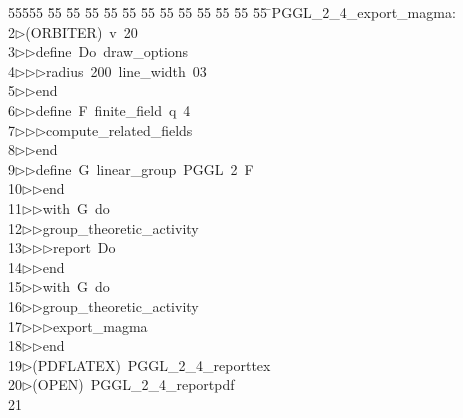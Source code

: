 %
%
\begin{tabbing}
55555 \= 55 \= 55 \= 55 \= 55 \= 55 \= 55 \= 55 \= 55 \= 55 \= 55 \= 55 \= 55 \= \>PGGL\_2\_4\_export\_magma:\\[0pt]
2\>$\triangleright$\>(ORBITER)\ v\ 20\ \\[0pt]
3\>$\triangleright$\>$\triangleright$\>define\ Do\ draw\_options\ \\[0pt]
4\>$\triangleright$\>$\triangleright$\>$\triangleright$\>radius\ 200\ line\_width\ 03\ \\[0pt]
5\>$\triangleright$\>$\triangleright$\>end\ \\[0pt]
6\>$\triangleright$\>$\triangleright$\>define\ F\ finite\_field\ q\ 4\ \\[0pt]
7\>$\triangleright$\>$\triangleright$\>$\triangleright$\>compute\_related\_fields\ \\[0pt]
8\>$\triangleright$\>$\triangleright$\>end\ \\[0pt]
9\>$\triangleright$\>$\triangleright$\>define\ G\ linear\_group\ PGGL\ 2\ F\ \\[0pt]
10\>$\triangleright$\>$\triangleright$\>end\ \\[0pt]
11\>$\triangleright$\>$\triangleright$\>with\ G\ do\ \\[0pt]
12\>$\triangleright$\>$\triangleright$\>group\_theoretic\_activity\ \\[0pt]
13\>$\triangleright$\>$\triangleright$\>$\triangleright$\>report\ Do\ \\[0pt]
14\>$\triangleright$\>$\triangleright$\>end\ \\[0pt]
15\>$\triangleright$\>$\triangleright$\>with\ G\ do\ \\[0pt]
16\>$\triangleright$\>$\triangleright$\>group\_theoretic\_activity\ \\[0pt]
17\>$\triangleright$\>$\triangleright$\>$\triangleright$\>export\_magma\ \\[0pt]
18\>$\triangleright$\>$\triangleright$\>end\\[0pt]
19\>$\triangleright$\>(PDFLATEX)\ PGGL\_2\_4\_reporttex\\[0pt]
20\>$\triangleright$\>(OPEN)\ PGGL\_2\_4\_reportpdf\\[0pt]
21\>\end{tabbing}

